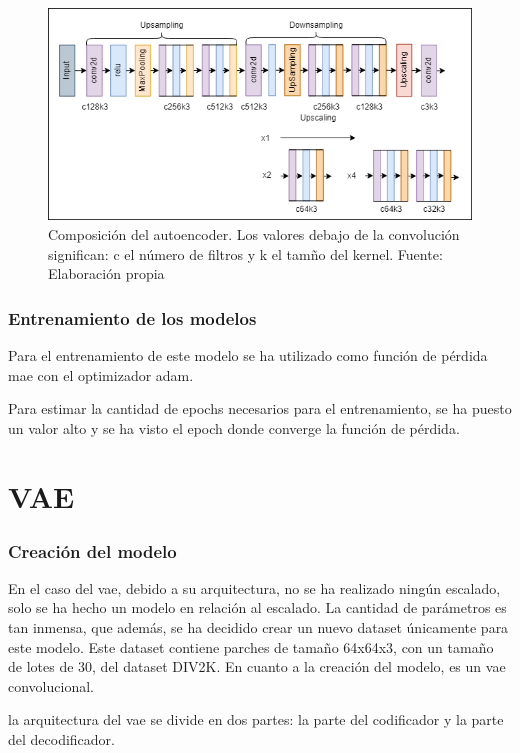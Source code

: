 \begin{figure}[H]
	\centering
	\includegraphics[width=1\textwidth]{figures/autoencoder.png}
	\caption{\label{fig:autoencoder}Composición del autoencoder. Los valores debajo de la convolución significan: c el número de filtros y k el tamño del kernel. Fuente: Elaboración propia}
\end{figure}

\subsubsection{Entrenamiento de los modelos}

Para el entrenamiento de este modelo se ha utilizado como función de pérdida \gls{mae} con el optimizador adam.

Para estimar la cantidad de epochs necesarios para el entrenamiento, se ha puesto un valor alto y se ha visto el epoch donde converge la función de pérdida.

\section{VAE}

\subsubsection{Creación del modelo}

\quad En el caso del \gls{vae}, debido a su arquitectura, no se ha realizado ningún escalado, solo se ha hecho un modelo en relación al escalado. La cantidad de parámetros es tan inmensa, que además, se ha decidido crear un nuevo dataset únicamente para este modelo. Este dataset contiene parches de tamaño 64x64x3, con un tamaño de lotes de 30, del dataset DIV2K. En cuanto a la creación del modelo, es un \gls{vae} convolucional.

la arquitectura del \gls{vae} se divide en dos partes: la parte del codificador y la parte del decodificador.

